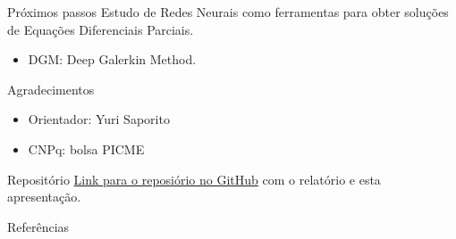 \documentclass[13pt]{beamer}
\begin{document}

\begin{frame}{Próximos passos}
    Estudo de Redes Neurais como ferramentas para obter soluções de Equações Diferenciais Parciais.
    \begin{itemize}
        \item<2-> DGM: Deep Galerkin Method.
    \end{itemize}
\end{frame}


\begin{frame}{Agradecimentos}
    \begin{itemize}
        \item<1-> Orientador: Yuri Saporito
        \item<2-> CNPq: bolsa PICME
    \end{itemize}
\end{frame}

\begin{frame}{Repositório}
    \href{https://github.com/Caioflp/relatorio-ic}{Link para o reposiório no GitHub} com o relatório e esta apresentação.
\end{frame}


\begin{frame}{Referências}
    \printbibliography[heading=bibintoc, title={Referências}]
\end{frame}
\end{document}
